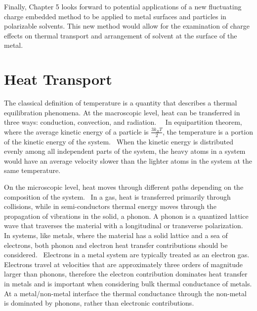 Finally, Chapter 5 looks forward to potential applications of a new fluctuating charge embedded method to be applied to metal surfaces and particles in polarizable solvents. This new method would allow for the examination of charge effects on thermal transport and arrangement of solvent at the surface of the metal.

\section{Heat Transport}
The classical definition of temperature is a quantity that describes a thermal equilibration phenomena. At the macroscopic level, heat can be transferred in three ways: conduction, convection, and radiation.~~\cite{Chen2005} 
In equipartition theorem, where the average kinetic energy of a particle is \(\frac{3k_{B}T}{2}\), the temperature is a portion of the kinetic energy of the system.~\cite{Goldstein2001}
When the kinetic energy is distributed evenly among all independent parts of the system, the heavy atoms in a system would have an average velocity slower than the lighter atoms in the system at the same temperature.

On the microscopic level, heat moves through different paths depending on the composition of the system.~\cite{Chen2005}
In a gas, heat is transferred primarily through collisions, while in semi-conductors thermal energy moves through the propagation of vibrations in the solid, a phonon. 
A phonon is a quantized lattice wave that traverses the material with a longitudinal or transverse polarization.~\cite{Kittel} 
In systems, like metals, where the material has a solid lattice and a sea of electrons, both phonon and electron heat transfer contributions should be considered.~\cite{Kittel} 
Electrons in a metal system are typically treated as an electron gas.
Electrons travel at velocities that are approximately three orders of magnitude larger than phonons, therefore the electron contribution dominates heat transfer in metals and is important when considering bulk thermal conductance of metals.
At a metal/non-metal interface the thermal conductance through the non-metal is dominated by phonons, rather than electronic contributions.~\cite{Chen2005, Cahill2011, Stoner1993}

